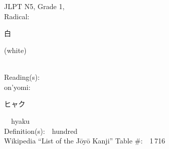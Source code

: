 \begin{multicols}{2}
\ \ \\
{\fontsize{34pt}{40pt}  }\ \ \\  %
{JLPT N5, Grade 1, \\Radical:\ \ {\begin{CJK}{UTF8}{min} 白 \end{CJK}} (white) } \\
Reading(s):\ \ \\
{\hspace*{1em}}on'yomi:\ \ \\
{\hspace*{2em}}{\begin{CJK}{UTF8}{min} ヒャク \end{CJK}}\ \ hyaku\ \ \\
Definition(s):\ \ hundred \\
Wikipedia ``List of the J\=oy\=o Kanji'' Table \#:\ \ 1\,716 \\
\ \ \\
\end{multicols}



